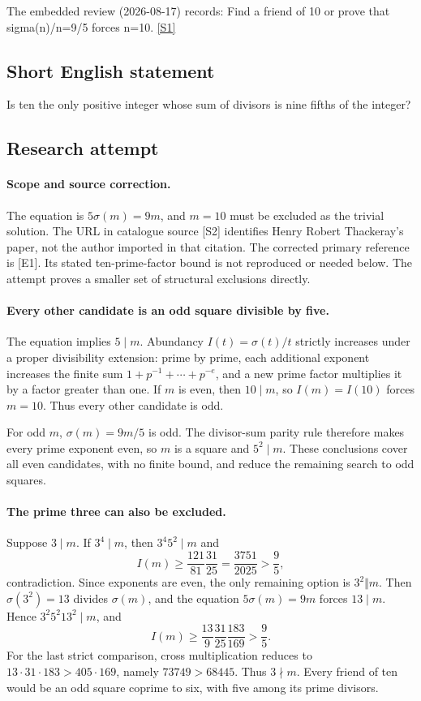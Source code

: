 \documentclass[11pt,a4paper]{article}
\newcommand{\sref}[2]{\hyperlink{source:#1:#2}{[S#2]}}
\begin{document}
The embedded review (2026-08-17) records: Find a friend of 10 or prove that sigma(n)/n=9/5 forces n=10. \sref{1260}{1}

\subsection{Short English statement}

Is ten the only positive integer whose sum of divisors is nine fifths of the integer?

\subsection{Research attempt}

\paragraph{Scope and source correction.}
The equation is $5\sigma(m)=9m$, and $m=10$ must be excluded as the
trivial solution. The URL in catalogue source [S2] identifies Henry
Robert Thackeray's paper, not the author imported in that citation.
The corrected primary reference is [E1]. Its stated ten-prime-factor
bound is not reproduced or needed below. The attempt proves a smaller
set of structural exclusions directly.

\paragraph{Every other candidate is an odd square divisible by five.}
The equation implies $5\mid m$. Abundancy $I(t)=\sigma(t)/t$ strictly
increases under a proper divisibility extension: prime by prime, each
additional exponent increases the finite sum $1+p^{-1}+\cdots+p^{-e}$,
and a new prime factor multiplies it by a factor greater than one.
If $m$ is even, then $10\mid m$, so $I(m)=I(10)$ forces $m=10$.
Thus every other candidate is odd.

For odd $m$, $\sigma(m)=9m/5$ is odd. The divisor-sum parity rule
therefore makes every prime exponent even, so $m$ is a square and
$5^2\mid m$. These conclusions cover all even candidates, with no
finite bound, and reduce the remaining search to odd squares.

\paragraph{The prime three can also be excluded.}
Suppose $3\mid m$. If $3^4\mid m$, then $3^4 5^2\mid m$ and
\[
 I(m)\ge\frac{121}{81}\frac{31}{25}
        =\frac{3751}{2025}>\frac95,
\]
contradiction. Since exponents are even, the only remaining option is
$3^2\Vert m$. Then $\sigma(3^2)=13$ divides $\sigma(m)$, and the
equation $5\sigma(m)=9m$ forces $13\mid m$. Hence
$3^2 5^2 13^2\mid m$, and
\[
 I(m)\ge\frac{13}{9}\frac{31}{25}\frac{183}{169}
        >\frac95.
\]
For the last strict comparison, cross multiplication reduces to
$13\cdot31\cdot183>405\cdot169$, namely $73749>68445$.
Thus $3\nmid m$. Every friend of ten would be an odd square coprime
to six, with five among its prime divisors.
\end{document}
